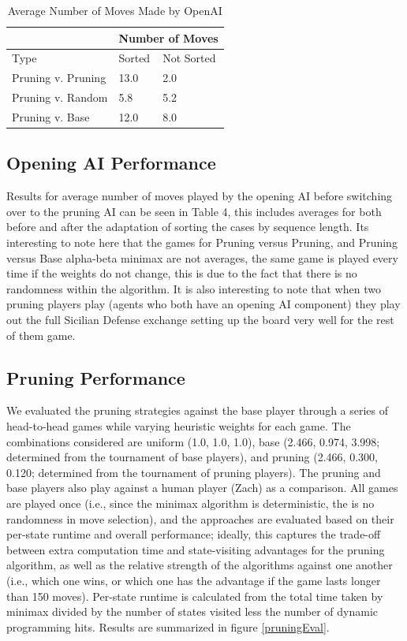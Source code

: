 \documentclass[letterpaper]{article}
\begin{document}
\begin{table}[]
\centering
\begin{tabular}{|l|l|l|}
\hline
 & \multicolumn{2}{l|}{Number of Moves} \\ \hline
Type & Sorted & Not Sorted \\ \hline
Pruning v. Pruning & 13.0 & 2.0 \\ \hline
Pruning v. Random & 5.8 & 5.2 \\ \hline
Pruning v. Base & 12.0 & 8.0 \\ \hline
\end{tabular}
\caption{Average Number of Moves Made by OpenAI}
\label{tab:my-table}
\end{table}

\subsection{Opening AI Performance}
Results for average number of moves played by the opening AI before switching over to the pruning AI can be seen in Table 4, this includes averages for both before and after the adaptation of sorting the cases by sequence length. Its interesting to note here that the games for Pruning versus Pruning, and Pruning versus Base alpha-beta minimax are not averages, the same game is played every time if the weights do not change, this is due to the fact that there is no randomness within the algorithm. It is also interesting to note that when two pruning players play (agents who both have an opening AI component) they play out the full Sicilian Defense exchange setting up the board very well for the rest of them game. 


\subsection{Pruning Performance}
We evaluated the pruning strategies against the base player through a series of head-to-head games while varying heuristic weights for each game.  The combinations considered are uniform (1.0, 1.0, 1.0), base (2.466, 0.974, 3.998; determined from the tournament of base players), and pruning (2.466, 0.300, 0.120; determined from the tournament of pruning players).  The pruning and base players also play against a human player (Zach) as a comparison.  All games are played once (i.e., since the minimax algorithm is deterministic, the is no randomness in move selection), and the approaches are evaluated based on their per-state runtime and overall performance; ideally, this captures the trade-off between extra computation time and state-visiting advantages for the pruning algorithm, as well as the relative strength of the algorithms against one another (i.e., which one wins, or which one has the advantage if the game lasts longer than 150 moves).  Per-state runtime is calculated from the total time taken by minimax divided by the number of states visited less the number of dynamic programming hits.  Results are summarized in figure \ref{pruningEval}.
\end{document}
